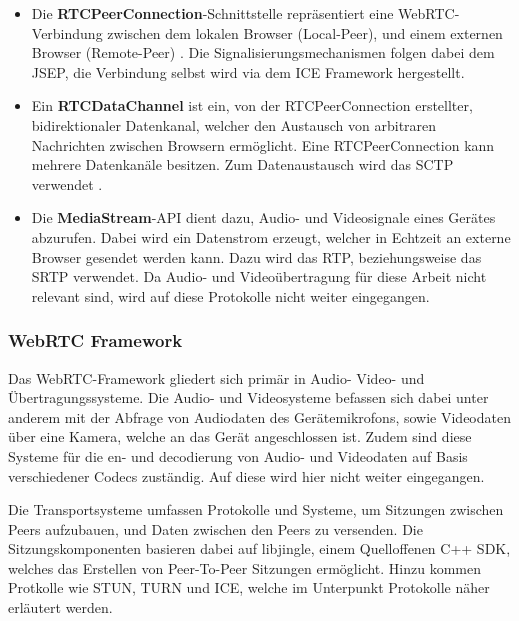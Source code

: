 \begin{itemize}
  \item Die \textbf{RTCPeerConnection}-Schnittstelle repräsentiert eine WebRTC-Verbindung zwischen dem lokalen Browser (Local-Peer), und einem externen Browser (Remote-Peer) \cite{rtcpeerconnection}. Die Signalisierungsmechanismen folgen dabei dem \ac{JSEP}, die Verbindung selbst wird via dem \ac{ICE} Framework hergestellt.
  
  \item Ein \textbf{RTCDataChannel} ist ein, von der RTCPeerConnection erstellter, bidirektionaler Datenkanal, welcher den Austausch von arbitraren Nachrichten zwischen Browsern ermöglicht. Eine RTCPeerConnection kann mehrere Datenkanäle besitzen. Zum Datenaustausch wird das \ac{SCTP} verwendet \cite{rtcpeerconnection}.
  
  \item Die \textbf{MediaStream}-\acs{API} dient dazu, Audio- und Videosignale eines Gerätes abzurufen. Dabei wird ein Datenstrom erzeugt, welcher in Echtzeit an externe Browser gesendet werden kann. Dazu wird das \ac{RTP}, beziehungsweise das \ac{SRTP} verwendet. Da Audio- und Videoübertragung für diese Arbeit nicht relevant sind, wird auf diese Protokolle nicht weiter eingegangen.
\end{itemize}

\subsubsection*{WebRTC Framework}
Das \acs{WebRTC}-Framework gliedert sich primär in Audio- Video- und Übertragungssysteme. Die Audio- und Videosysteme befassen sich dabei unter anderem mit der Abfrage von Audiodaten des Gerätemikrofons, sowie Videodaten über eine Kamera, welche an das Gerät angeschlossen ist. Zudem sind diese Systeme für die en- und decodierung von Audio- und Videodaten auf Basis verschiedener \glqq{}Codecs\grqq{} zuständig. Auf diese wird hier nicht weiter eingegangen.\par

Die Transportsysteme umfassen Protokolle und Systeme, um Sitzungen zwischen Peers aufzubauen, und Daten zwischen den Peers zu versenden. Die Sitzungskomponenten basieren dabei auf \glqq{}libjingle\grqq{}, einem Quelloffenen C++ \ac{SDK}, welches das Erstellen von Peer-To-Peer Sitzungen ermöglicht. Hinzu kommen Protkolle wie \acs{STUN}, \acs{TURN} und \acs{ICE}, welche im Unterpunkt \glqq{}Protokolle\grqq{} näher erläutert werden.


